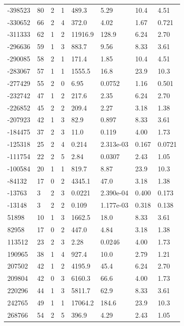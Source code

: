 \documentclass[preview]{standalone}
\begin{document}
{{\begin{tabular}{L{1.2cm}C{1.2cm} C{0.3cm}C{0.5cm} C{1.4cm}C{1.4cm} C{1.4cm}C{1.4cm}}
  -398523  &    80  & 2     &  1 &  489.3  & 5.29  & 10.4 &  4.51   \\ 
  -330652  &    66  & 2     &  4 &  372.0  & 4.02  & 1.67 &  0.721   \\ 
  -311333  &    62  & 1     &  2 &  11916.9  & 128.9  & 6.24 &  2.70   \\ 
  -296636  &    59  & 1     &  3 &  883.7  & 9.56  & 8.33 &  3.61   \\ 
  -290085  &    58  & 2     &  1 &  171.4  & 1.85  & 10.4 &  4.51   \\ 
  -283067  &    57  & 1     &  1 &  1555.5  & 16.8  & 23.9 &  10.3   \\ 
  -277429  &    55  & 2     &  0 &  6.95  & 0.0752  & 1.16 &  0.501   \\ 
  -232742  &    47  & 1     &  2 &  217.6  & 2.35  & 6.24 &  2.70   \\ 
  -226852  &    45  & 2     &  2 &  209.4  & 2.27  & 3.18 &  1.38   \\ 
  -207923  &    42  & 1     &  3 &  82.9  & 0.897  & 8.33 &  3.61   \\ 
  -184475  &    37  & 2     &  3 &  11.0  & 0.119  & 4.00 &  1.73   \\ 
  -125318  &    25  & 2     &  4 &  0.214  & 2.313e-03  & 0.167 &  0.0721   \\ 
  -111754  &    22  & 2     &  5 &  2.84  & 0.0307  & 2.43 &  1.05   \\ 
  -100584  &    20  & 1     &  1 &  819.7  & 8.87  & 23.9 &  10.3   \\ 
  -84132  &    17  & 0     &  2 &  4345.1  & 47.0  & 3.18 &  1.38   \\ 
  -13763  &     3  & 2     &  3 &  0.0221  & 2.390e-04  & 0.400 &  0.173   \\ 
  -13148  &     3  & 2     &  2 &  0.109  & 1.177e-03  & 0.318 &  0.138   \\ 
  51898  &    10  & 1     &  3 &  1662.5  & 18.0  & 8.33 &  3.61   \\ 
  82958  &    17  & 0     &  2 &  447.0  & 4.84  & 3.18 &  1.38   \\ 
  113512  &    23  & 2     &  3 &  2.28  & 0.0246  & 4.00 &  1.73   \\ 
  190965  &    38  & 1     &  4 &  927.4  & 10.0  & 2.79 &  1.21   \\ 
  207502  &    42  & 1     &  2 &  4195.9  & 45.4  & 6.24 &  2.70   \\ 
  209804  &    42  & 0     &  3 &  6160.3  & 66.6  & 4.00 &  1.73   \\ 
  220296  &    44  & 1     &  3 &  5811.7  & 62.9  & 8.33 &  3.61   \\ 
  242765  &    49  & 1     &  1 &  17064.2  & 184.6  & 23.9 &  10.3   \\ 
  268766  &    54  & 2     &  5 &  396.9  & 4.29  & 2.43 &  1.05   \\ 
\hline 
\end{tabular} 

}}
\end{document}
